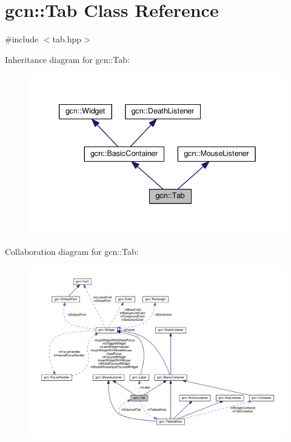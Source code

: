 \hypertarget{classgcn_1_1Tab}{}\section{gcn\+:\+:Tab Class Reference}
\label{classgcn_1_1Tab}


{\ttfamily \#include $<$tab.\+hpp$>$}



Inheritance diagram for gcn\+:\+:Tab\+:\nopagebreak
\begin{figure}[H]
\begin{center}
\leavevmode
\includegraphics[width=339pt]{classgcn_1_1Tab__inherit__graph}
\end{center}
\end{figure}


Collaboration diagram for gcn\+:\+:Tab\+:\nopagebreak
\begin{figure}[H]
\begin{center}
\leavevmode
\includegraphics[width=350pt]{classgcn_1_1Tab__coll__graph}
\end{center}
\end{figure}
